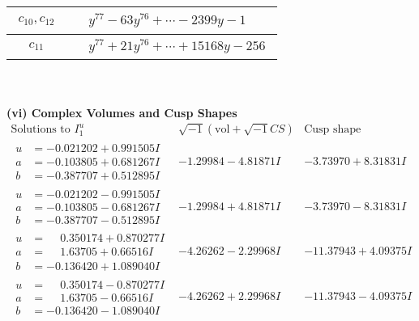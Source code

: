 \documentclass[1p]{elsarticle_modified}
\theoremstyle{definition}
\newcommand{\I}{\sqrt{-1}}
\begin{document}
\begin{tabular}{m{50pt}|m{274pt}}
\hline $$\begin{aligned}c_{10},c_{12}\end{aligned}$$&$\begin{aligned}
&y^{77}-63 y^{76}+\cdots-2399 y-1
\end{aligned}$\\
\hline $$\begin{aligned}c_{11}\end{aligned}$$&$\begin{aligned}
&y^{77}+21 y^{76}+\cdots+15168 y-256
\end{aligned}$\\
\hline
\end{tabular}\\~\\
\newpage\flushleft \textbf{(vi) Complex Volumes and Cusp Shapes}
$$\begin{array}{c|c|c}  
\text{Solutions to }I^u_{1}& \I (\text{vol} + \sqrt{-1}CS) & \text{Cusp shape}\\
 \hline 
\begin{aligned}
u &= -0.021202 + 0.991505 I \\
a &= -0.103805 + 0.681267 I \\
b &= -0.387707 + 0.512895 I\end{aligned}
 & -1.29984 - 4.81871 I & -3.73970 + 8.31831 I \\ \hline\begin{aligned}
u &= -0.021202 - 0.991505 I \\
a &= -0.103805 - 0.681267 I \\
b &= -0.387707 - 0.512895 I\end{aligned}
 & -1.29984 + 4.81871 I & -3.73970 - 8.31831 I \\ \hline\begin{aligned}
u &= \phantom{-}0.350174 + 0.870277 I \\
a &= \phantom{-}1.63705 + 0.66516 I \\
b &= -0.136420 + 1.089040 I\end{aligned}
 & -4.26262 - 2.29968 I & -11.37943 + 4.09375 I \\ \hline\begin{aligned}
u &= \phantom{-}0.350174 - 0.870277 I \\
a &= \phantom{-}1.63705 - 0.66516 I \\
b &= -0.136420 - 1.089040 I\end{aligned}
 & -4.26262 + 2.29968 I & -11.37943 - 4.09375 I \\ \hline\begin{aligned}

\end{aligned}
\end{array}$$
\end{document}
